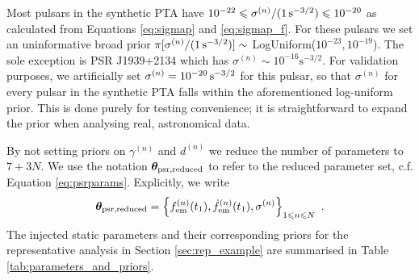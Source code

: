 \documentclass[fleqn,usenatbib,useAMS]{mnras}
\begin{document}
Most pulsars in the synthetic PTA have $10^{-22} \leq \sigma^{(n)} / (1 \, {\rm s^{-3/2}}) \leq 10^{-20}$ as calculated from Equations \eqref{eq:sigmap} and \eqref{eq:sigmap_f}. For these pulsars we set an uninformative broad prior $\pi[\sigma^{(n)} / (1 \, {\rm s^{-3/2}})] \sim$ LogUniform($10^{-23}, 10^{-19}$). The sole exception is PSR J1939+2134 which has $\sigma^{(n)} \sim 10^{-16} \text{s}^{-3/2}$. For validation purposes, we artificially set $\sigma^{(n)} = 10^{-20} \, {\rm s^{-3/2}}$ for this pulsar, so that $\sigma^{(n)}$ for every pulsar in the synthetic PTA falls within the aforementioned log-uniform prior. This is done purely for testing convenience; it is straightforward to expand the prior when analysing real, astronomical data. \newline 


By not setting priors on $\gamma^{(n)}$ and $d^{(n)}$ we reduce the number of parameters to $7 + 3N$. We use the notation $\boldsymbol{\theta}_{\rm psr, reduced}$ to refer to the reduced parameter set, c.f. Equation \eqref{eq:psrparams}. Explicitly, we write
\begin{equation}
	\boldsymbol{\theta}_{\rm psr, reduced} = \left \{ f_{\rm em}^{(n)}(t_1),\dot{f}_{\rm em}^{(n)}(t_1),\sigma^{(n)}\right\}_{1\leq n \leq N} \ . \label{eq:psrreduced}
\end{equation}
The injected static parameters and their corresponding priors for the representative analysis in Section \ref{sec:rep_example} are summarised in Table \ref{tab:parameters_and_priors}.
\end{document}
